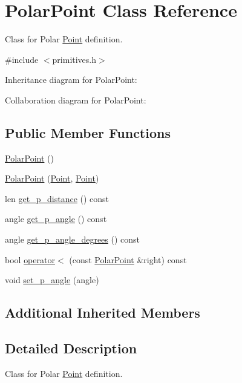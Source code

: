 \hypertarget{classPolarPoint}{}\section{Polar\+Point Class Reference}
\label{classPolarPoint}


Class for Polar \hyperlink{classPoint}{Point} definition.  




{\ttfamily \#include $<$primitives.\+h$>$}



Inheritance diagram for Polar\+Point\+:


Collaboration diagram for Polar\+Point\+:
\subsection*{Public Member Functions}
\begin{DoxyCompactItemize}
\item 
\hyperlink{classPolarPoint_aa5dc669fa33f48c9dccd235751cb8db5}{Polar\+Point} ()
\item 
\hyperlink{classPolarPoint_a85656b69c29c9f60781dd734926863b6}{Polar\+Point} (\hyperlink{classPoint}{Point}, \hyperlink{classPoint}{Point})
\item 
len \hyperlink{classPolarPoint_afb68d253c45fe88bc49fafcf81ec2276}{get\+\_\+p\+\_\+distance} () const
\item 
angle \hyperlink{classPolarPoint_a5918f355697069f0e54e924673c7a872}{get\+\_\+p\+\_\+angle} () const
\item 
angle \hyperlink{classPolarPoint_a32537087535c21aee75a7799c168645d}{get\+\_\+p\+\_\+angle\+\_\+degrees} () const
\item 
bool \hyperlink{classPolarPoint_a705e9afe8f23c0cac34b25a006c574e8}{operator$<$} (const \hyperlink{classPolarPoint}{Polar\+Point} \&right) const
\item 
void \hyperlink{classPolarPoint_ac63f2017507c73c4bd3c5f89994627ef}{set\+\_\+p\+\_\+angle} (angle)
\end{DoxyCompactItemize}
\subsection*{Additional Inherited Members}


\subsection{Detailed Description}
Class for Polar \hyperlink{classPoint}{Point} definition. 

